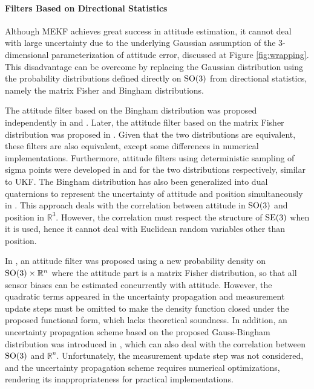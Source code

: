 \paragraph{Filters Based on Directional Statistics}

Although MEKF achieves great success in attitude estimation, it cannot deal with large uncertainty due to the underlying Gaussian assumption of the 3-dimensional parameterization of attitude error, discussed at Figure \ref{fig:wrapping}.
This disadvantage can be overcome by replacing the Gaussian distribution using the probability distributions defined directly on $\mathrm{SO}(3)$ from directional statistics, namely the matrix Fisher and Bingham distributions.

The attitude filter based on the Bingham distribution was proposed independently in \cite{glover2014tracking} and \cite{kurz2014recursive}.
Later, the attitude filter based on the matrix Fisher distribution was proposed in \cite{lee2018bayesian}.
Given that the two distributions are equivalent, these filters are also equivalent, except some differences in numerical implementations.
Furthermore, attitude filters using deterministic sampling of sigma points were developed in \cite{gilitschenski2015unscented} and \cite{lee2018bayesian} for the two distributions respectively, similar to UKF.
The Bingham distribution has also been generalized into dual quaternions to represent the uncertainty of attitude and position simultaneously in \cite{arun2018probabilistic,gilitschenski2014new,li2019geometry,li2020unscented}.
This approach deals with the correlation between attitude in $\mathrm{SO}(3)$ and position in $\mathbb{R}^3$.
However, the correlation must respect the structure of $\mathrm{SE}(3)$ when it is used, hence it cannot deal with Euclidean random variables other than position.

In \cite{markley2006attitude}, an attitude filter was proposed using a new probability density on $\mathrm{SO}(3)\times \mathbb{R}^n$ where the attitude part is a matrix Fisher distribution, so that all sensor biases can be estimated concurrently with attitude.
However, the quadratic terms appeared in the uncertainty propagation and measurement update steps must be omitted to make the density function closed under the proposed functional form, which lacks theoretical soundness.
In addition, an uncertainty propagation scheme based on the proposed Gauss-Bingham distribution was introduced in \cite{darling2016uncertainty}, which can also deal with the correlation between $\mathrm{SO}(3)$ and $\mathbb{R}^n$.
Unfortunately, the measurement update step was not considered, and the uncertainty propagation scheme requires numerical optimizations, rendering its inappropriateness for practical implementations.

